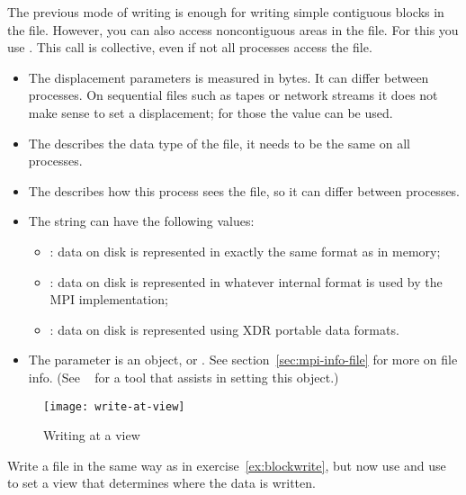The previous mode of writing is enough for writing simple contiguous blocks in the file.
However,
you can also access noncontiguous areas in the file. For this you use
%
.
%
This call is collective, even if not all processes access the file.
\begin{itemize}
\item The  displacement parameters is measured in bytes. It
  can differ between processes. On sequential files such as tapes or
  network streams it does not make sense to set a displacement; for
  those the  value can be
  used.
\item The  describes the data type of the file, it needs to
  be the same on all processes.
\item The  describes how this process sees the file, so it
  can differ between processes.
\item The  string can have the following values:
  \begin{itemize}
  \item {}: data on disk is represented in exactly the same
    format as in memory;
  \item {}: data on disk is represented in whatever internal
    format is used by the MPI implementation;
  \item {}: data on disk is represented using XDR portable
    data formats.
  \end{itemize}
\item The  parameter is an  object,
  or .
  See section~\ref{sec:mpi-info-file} for more on file info.
  (See ~\cite{t3pio-git} for a tool that 
  assists in setting this object.)
\end{itemize}


\begin{figure}[ht]
  \label{fig:write-view}
  \caption{Writing at a view}
  \texttt{[image: write-at-view]}
\end{figure}

\begin{exercise}
  \label{ex:viewwrite}
  Write a file in the same way as in exercise~\ref{ex:blockwrite},
  but now use  and use  to set
  a view that determines where the data is written.
\end{exercise}

